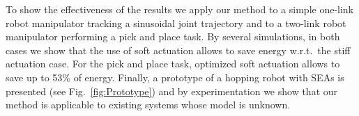 To show the effectiveness of the results we apply our method to a simple one-link robot manipulator tracking a sinusoidal joint trajectory and to a two-link robot manipulator performing a pick and place task. 
By several simulations, in both cases we show that the use of soft actuation allows to save energy w.r.t.~the stiff actuation case. For the pick and place task, optimized soft actuation allows to save up to 53\% of energy. 
Finally, a prototype of a hopping robot with SEAs is presented (see Fig.~\ref{fig:Prototype}) and by experimentation we show that our method is applicable to existing systems whose model is unknown.
